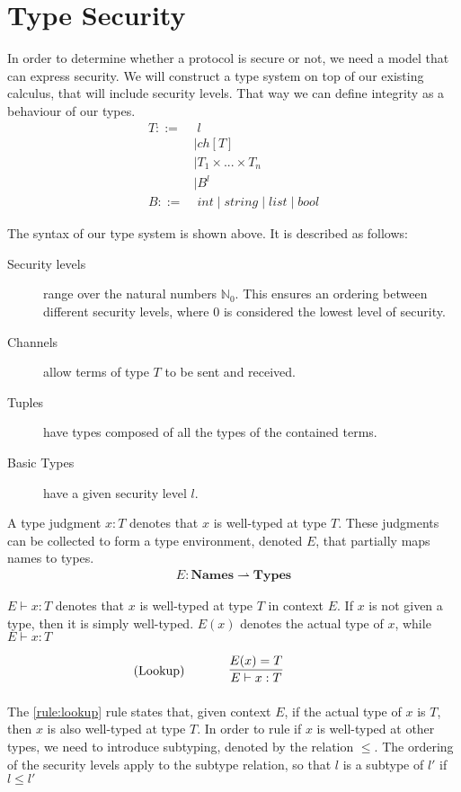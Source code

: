 \section{Type Security}
In order to determine whether a protocol is secure or not, we need a model that can express security.
We will construct a type system on top of our existing calculus, that will include security levels.
That way we can define integrity as a behaviour of our types.
\begin{align*}
	T::=&\;l \tag{Security Level}\\
	&\mid ch[T] \tag{Channel}\\
	&\mid T_1 \times...\times T_n \tag{Tuple}\\
	&\mid B^l \tag{Basic}\\
	B::=&\;int 
	\mid string 
	\mid list 
	\mid bool 
\end{align*}

\noindent The syntax of our type system is shown above. It is described as follows:

\begin{description}
\item[Security levels] range over the natural numbers $\mathbb{N}_0$. This ensures an ordering between different security levels, where $0$ is considered the lowest level of security.
\item[Channels] allow terms of type $T$ to be sent and received.
\item[Tuples] have types composed of all the types of the contained terms.
\item[Basic Types] have a given security level $l$.
\end{description}

\noindent A type judgment $x:T$ denotes that $x$ is well-typed at type $T$.
These judgments can be collected to form a type environment, denoted $E$, that partially maps names to types.
\begin{align*}
E: \mathbf{Names} \rightharpoonup \mathbf{Types}
\end{align*}

\noindent $E\vdash x:T$ denotes that $x$ is well-typed at type $T$ in context $E$.
If $x$ is not given a type, then it is simply well-typed. $E(x)$ denotes the actual type of $x$, while $E\vdash x:T$ 

\begin{align*}
\tag{Lookup}\label{rule:lookup} &\infrule{E(x)=T}{E\vdash x:T}
\end{align*}

The \ref{rule:lookup} rule states that, given context $E$, if the actual type of $x$ is $T$, then $x$ is also well-typed at type $T$. 
In order to rule if $x$ is well-typed at other types, we need to introduce subtyping, denoted by the relation $\leq$. The ordering of the security levels apply to the subtype relation, so that $l$ is a subtype of $l'$ if $l\leq l'$

